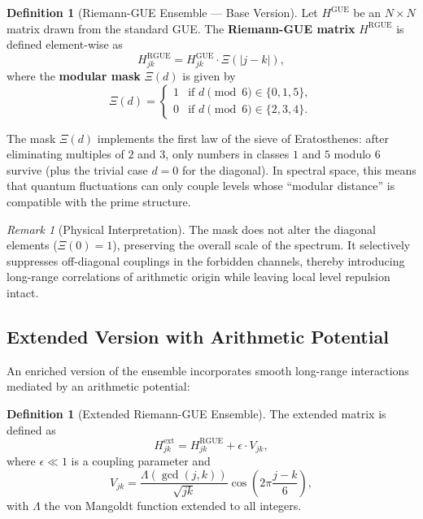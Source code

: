 \documentclass[12pt,a4paper]{article}
\theoremstyle{plain}
\theoremstyle{definition}
\newtheorem{definition}[theorem]{Definition}
\theoremstyle{remark}
\newtheorem{remark}[theorem]{Remark}
\begin{document}
\begin{definition}[Riemann-GUE Ensemble --- Base Version]
\label{def:ensemble_base}
Let $H^{\text{GUE}}$ be an $N \times N$ matrix drawn from the standard GUE. The \textbf{Riemann-GUE matrix} $H^{\text{RGUE}}$ is defined element-wise as
\begin{equation}
H^{\text{RGUE}}_{jk} = H^{\text{GUE}}_{jk} \cdot \Xi(|j-k|),
\label{eq:rgue_def}
\end{equation}
where the \textbf{modular mask} $\Xi(d)$ is given by
\begin{equation}
\Xi(d) = 
\begin{cases}
1 & \text{if } d \pmod{6} \in \{0, 1, 5\}, \\
0 & \text{if } d \pmod{6} \in \{2, 3, 4\}.
\end{cases}
\label{eq:mask}
\end{equation}
\end{definition}

The mask $\Xi(d)$ implements the first law of the sieve of Eratosthenes: after eliminating multiples of $2$ and $3$, only numbers in classes $1$ and $5$ modulo $6$ survive (plus the trivial case $d=0$ for the diagonal). In spectral space, this means that quantum fluctuations can only couple levels whose ``modular distance'' is compatible with the prime structure.

\begin{remark}[Physical Interpretation]
The mask does not alter the diagonal elements ($\Xi(0)=1$), preserving the overall scale of the spectrum. It selectively suppresses off-diagonal couplings in the forbidden channels, thereby introducing long-range correlations of arithmetic origin while leaving local level repulsion intact.
\end{remark}

\subsection{Extended Version with Arithmetic Potential}
An enriched version of the ensemble incorporates smooth long-range interactions mediated by an arithmetic potential:

\begin{definition}[Extended Riemann-GUE Ensemble]
\label{def:ensemble_extended}
The extended matrix is defined as
\begin{equation}
H^{\text{ext}}_{jk} = H^{\text{RGUE}}_{jk} + \epsilon \cdot V_{jk},
\label{eq:extended}
\end{equation}
where $\epsilon \ll 1$ is a coupling parameter and
\begin{equation}
V_{jk} = \frac{\Lambda(\gcd(j,k))}{\sqrt{jk}} \cos\left(2\pi \frac{j-k}{6}\right),
\label{eq:potential}
\end{equation}
with $\Lambda$ the von Mangoldt function extended to all integers.
\end{definition}
\end{document}
